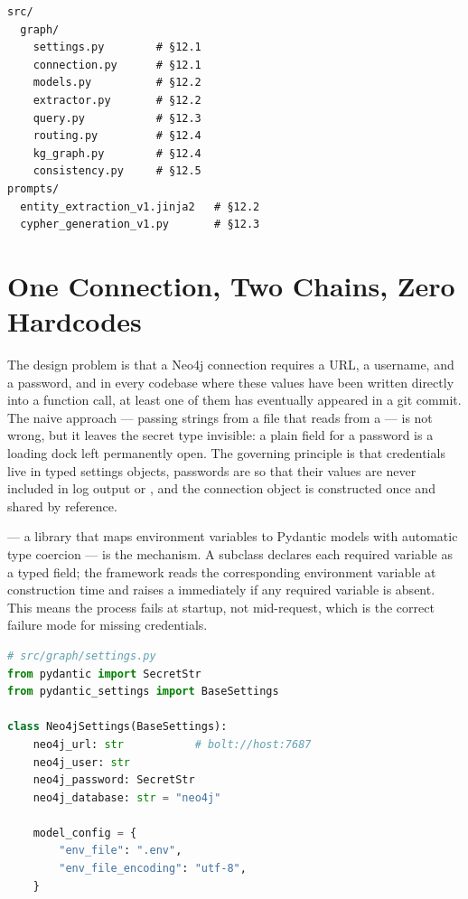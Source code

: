 \begin{verbatim}
src/
  graph/
    settings.py        # §12.1
    connection.py      # §12.1
    models.py          # §12.2
    extractor.py       # §12.2
    query.py           # §12.3
    routing.py         # §12.4
    kg_graph.py        # §12.4
    consistency.py     # §12.5
prompts/
  entity_extraction_v1.jinja2   # §12.2
  cypher_generation_v1.py       # §12.3
\end{verbatim}


\section{One Connection, Two Chains, Zero Hardcodes}
\label{sec:kg-connection}

The design problem is that a Neo4j connection requires a URL, a username,
and a password, and in every codebase where these values have been written
directly into a function call, at least one of them has eventually appeared
in a git commit. The naive approach --- passing strings from a
 file that reads from a  --- is not wrong, but
it leaves the secret type invisible: a plain  field for a password
is a loading dock left permanently open. The governing principle is that
credentials live in typed settings objects, passwords are 
so that their values are never included in log output or , and
the connection object is constructed once and shared by reference.

 --- a library that maps environment variables to
Pydantic models with automatic type coercion --- is the mechanism. A
 subclass declares each required variable as a typed
field; the framework reads the corresponding environment variable at
construction time and raises a  immediately if any
required variable is absent. This means the process fails at startup, not
mid-request, which is the correct failure mode for missing credentials.

\begin{lstlisting}[language=Python,
  caption={Neo4j settings model with typed secret field},
  label={lst:neo4j-settings}]
# src/graph/settings.py
from pydantic import SecretStr
from pydantic_settings import BaseSettings

class Neo4jSettings(BaseSettings):
    neo4j_url: str           # bolt://host:7687
    neo4j_user: str
    neo4j_password: SecretStr
    neo4j_database: str = "neo4j"

    model_config = {
        "env_file": ".env",
        "env_file_encoding": "utf-8",
    }
\end{lstlisting}

